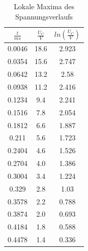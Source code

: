 \documentclass[11pt,ngerman,a4paper]{article}
\begin{document}
\newpage
\begin{table}[H]
\centering
\begin{tabular}{|c|c|c|}
\hline
$\frac{t}{ms}$ & $\frac{U_C}{V}$ & $ln(\frac{U_C}{V})$ \\
\hline
0.0046 & 18.6 & 2.923\\
0.0354 & 15.6 & 2.747\\
0.0642 & 13.2 & 2.58\\
0.0938 & 11.2 & 2.416\\
0.1234 & 9.4 & 2.241\\
0.1516 & 7.8 & 2.054\\
0.1812 & 6.6 & 1.887\\
0.211 & 5.6 & 1.723\\
0.2404 & 4.6 & 1.526\\
0.2704 & 4.0 & 1.386\\
0.3004 & 3.4 & 1.224\\
0.329 & 2.8 & 1.03\\
0.3578 & 2.2 & 0.788\\
0.3874 & 2.0 & 0.693\\
0.4184 & 1.8 & 0.588\\
0.4478 & 1.4 & 0.336\\
\hline
\end{tabular}
\label{mtab1}
\caption{Lokale Maxima des Spannungsverlaufs}
\end{table}
\end{document}
